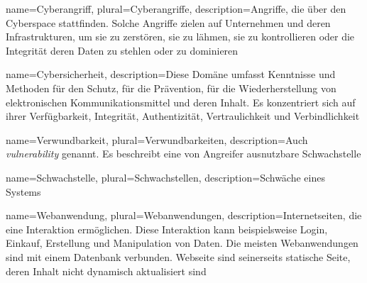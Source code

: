 


 {
    name={Cyberangriff},
    plural={Cyberangriffe},
    description={Angriffe, die über den Cyberspace stattfinden. Solche Angriffe zielen auf Unternehmen und deren Infrastrukturen, um sie zu zerstören, sie zu lähmen, sie zu kontrollieren oder die Integrität deren Daten zu stehlen oder zu dominieren \citep{NIST_Definitionen}}
}

 {
    name={Cybersicherheit},
    description={Diese Domäne umfasst Kenntnisse und Methoden für den Schutz, für die Prävention, für die Wiederherstellung von elektronischen Kommunikationsmittel und deren Inhalt. Es konzentriert sich auf ihrer Verfügbarkeit, Integrität, Authentizität, Vertraulichkeit und Verbindlichkeit \citep{NIST_Definitionen}}
}

 {
    name={Verwundbarkeit},
    plural={Verwundbarkeiten},
    description={Auch \textit{vulnerability} genannt. Es beschreibt eine von Angreifer ausnutzbare Schwachstelle \citep{Wendzel_It-Sicherheit}}
}

 {
    name={Schwachstelle},
    plural={Schwachstellen},
    description={Schwäche eines Systems \citep{Wendzel_It-Sicherheit}}
}

 {
    name={Webanwendung},
    plural={Webanwendungen},
    description={Internetseiten, die eine Interaktion ermöglichen. Diese Interaktion kann beispielsweise Login, Einkauf, Erstellung und Manipulation von Daten. Die meisten Webanwendungen sind mit einem Datenbank verbunden. Webseite sind seinerseits statische Seite, deren Inhalt nicht dynamisch aktualisiert sind \citep{Essential_Desigs_Seite_x_Anwendung}}
}


